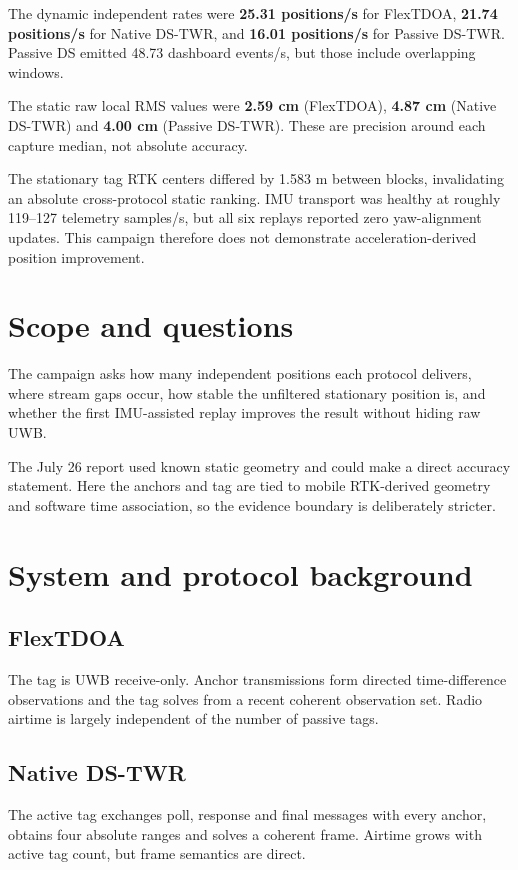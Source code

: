 \documentclass[10pt,a4paper]{article}
\begin{document}
The dynamic independent rates were \textbf{25.31 positions/s} for FlexTDOA, \textbf{21.74 positions/s} for Native DS-TWR, and \textbf{16.01 positions/s} for Passive DS-TWR. Passive DS emitted 48.73 dashboard events/s, but those include overlapping windows.

The static raw local RMS values were \textbf{2.59 cm} (FlexTDOA), \textbf{4.87 cm} (Native DS-TWR) and \textbf{4.00 cm} (Passive DS-TWR). These are precision around each capture median, not absolute accuracy.


The stationary tag RTK centers differed by 1.583 m between blocks, invalidating
an absolute cross-protocol static ranking. IMU transport was healthy at roughly
119--127 telemetry samples/s, but all six replays reported zero yaw-alignment
updates. This campaign therefore does not demonstrate acceleration-derived
position improvement.

\section{Scope and questions}
The campaign asks how many independent positions each protocol delivers, where
stream gaps occur, how stable the unfiltered stationary position is, and whether
the first IMU-assisted replay improves the result without hiding raw UWB.

The July 26 report used known static geometry and could make a direct accuracy
statement. Here the anchors and tag are tied to mobile RTK-derived geometry and
software time association, so the evidence boundary is deliberately stricter.

\section{System and protocol background}
\subsection{FlexTDOA}
The tag is UWB receive-only. Anchor transmissions form directed time-difference
observations and the tag solves from a recent coherent observation set. Radio
airtime is largely independent of the number of passive tags.

\subsection{Native DS-TWR}
The active tag exchanges poll, response and final messages with every anchor,
obtains four absolute ranges and solves a coherent frame. Airtime grows with
active tag count, but frame semantics are direct.
\end{document}
